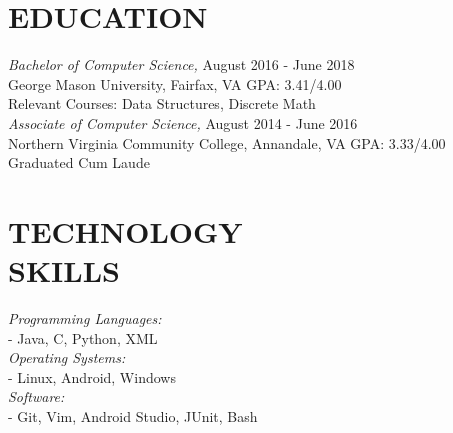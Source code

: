 \documentclass[margin, 10pt]{res} %
\begin{document}
\begin{resume}



\section{EDUCATION}

{\sl Bachelor of Computer Science,}  \hfill August 2016 - June 2018 \\
George Mason University, Fairfax, VA \hfill GPA: 3.41/4.00 \smallskip\\
Relevant Courses: Data Structures, Discrete Math\\

{\sl Associate of Computer Science,}  \hfill August 2014 - June 2016 \\
Northern Virginia Community College, Annandale, VA \hfill GPA: 3.33/4.00 \smallskip\\
Graduated Cum Laude\\
 

\section{TECHNOLOGY \\ SKILLS} 

{\sl Programming Languages:} \\ \null\qquad - Java, C, Python, XML \\
{\sl Operating Systems:} \\ \null\qquad - Linux, Android, Windows \\
{\sl Software:} \\ \null\qquad - Git, Vim, Android Studio, JUnit, Bash\\
 
 

\end{resume}
\end{document}
